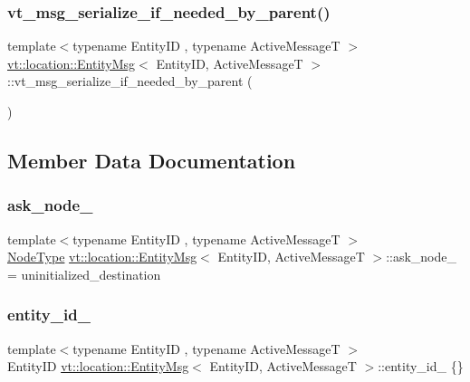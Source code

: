 \subsubsection{\texorpdfstring{vt\+\_\+msg\+\_\+serialize\+\_\+if\+\_\+needed\+\_\+by\+\_\+parent()}{vt\_msg\_serialize\_if\_needed\_by\_parent()}}
{\footnotesize\ttfamily template$<$typename Entity\+ID , typename Active\+MessageT $>$ \\
\hyperlink{structvt_1_1location_1_1_entity_msg}{vt\+::location\+::\+Entity\+Msg}$<$ Entity\+ID, Active\+MessageT $>$\+::vt\+\_\+msg\+\_\+serialize\+\_\+if\+\_\+needed\+\_\+by\+\_\+parent (\begin{DoxyParamCaption}{ }\end{DoxyParamCaption})}



\subsection{Member Data Documentation}
\mbox{\label{structvt_1_1location_1_1_entity_msg_ae1cae8c818d70070238c0f5b975e2a80}} 
\subsubsection{\texorpdfstring{ask\+\_\+node\+\_\+}{ask\_node\_}}
{\footnotesize\ttfamily template$<$typename Entity\+ID , typename Active\+MessageT $>$ \\
\hyperlink{namespacevt_a866da9d0efc19c0a1ce79e9e492f47e2}{Node\+Type} \hyperlink{structvt_1_1location_1_1_entity_msg}{vt\+::location\+::\+Entity\+Msg}$<$ Entity\+ID, Active\+MessageT $>$\+::ask\+\_\+node\+\_\+ = uninitialized\+\_\+destination\hspace{0.3cm}{\ttfamily [private]}}

\mbox{\label{structvt_1_1location_1_1_entity_msg_a7c50fcdb28e43633811173c6850380f2}} 
\subsubsection{\texorpdfstring{entity\+\_\+id\+\_\+}{entity\_id\_}}
{\footnotesize\ttfamily template$<$typename Entity\+ID , typename Active\+MessageT $>$ \\
Entity\+ID \hyperlink{structvt_1_1location_1_1_entity_msg}{vt\+::location\+::\+Entity\+Msg}$<$ Entity\+ID, Active\+MessageT $>$\+::entity\+\_\+id\+\_\+ \{\}\hspace{0.3cm}{\ttfamily [private]}}

